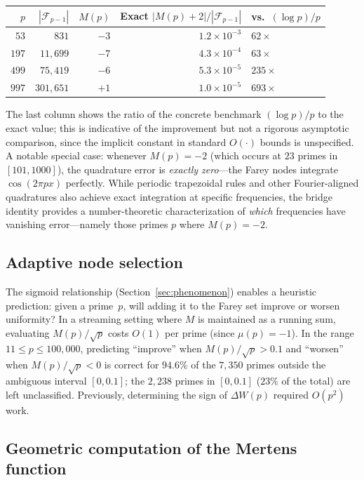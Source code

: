 \documentclass[11pt]{article}
\theoremstyle{definition}
\newcommand{\F}{\mathcal{F}}
\begin{document}
\begin{center}
\begin{tabular}{rrrrl}
\toprule
$p$ & $|\F_{p-1}|$ & $M(p)$ & Exact $|M(p)+2|/|\F_{p-1}|$ & vs.\ $(\log p)/p$ \\
\midrule
$53$ & $831$ & $-3$ & $1.2 \times 10^{-3}$ & $62\times$ \\
$197$ & $11{,}699$ & $-7$ & $4.3 \times 10^{-4}$ & $63\times$ \\
$499$ & $75{,}419$ & $-6$ & $5.3 \times 10^{-5}$ & $235\times$ \\
$997$ & $301{,}651$ & $+1$ & $1.0 \times 10^{-5}$ & $693\times$ \\
\bottomrule
\end{tabular}
\end{center}

\noindent The last column shows the ratio of the
concrete benchmark $(\log p)/p$ to the exact value;
this is indicative of the improvement but not a rigorous
asymptotic comparison, since the implicit constant in
standard $O(\cdot)$ bounds is unspecified.
A notable special case: whenever $M(p) = -2$
(which occurs at $23$ primes in $[101, 1000]$), the quadrature
error is \emph{exactly zero}---the Farey nodes integrate
$\cos(2\pi px)$ perfectly.  While periodic trapezoidal rules
and other Fourier-aligned quadratures also achieve exact integration
at specific frequencies, the bridge identity provides a number-theoretic
characterization of \emph{which} frequencies have vanishing error---namely
those primes $p$ where $M(p) = -2$.

\subsection{Adaptive node selection}

The sigmoid relationship (Section~\ref{sec:phenomenon}) enables
a heuristic prediction: given a prime~$p$, will adding it to the
Farey set improve or worsen uniformity?  In a streaming setting
where $M$ is maintained as a running sum, evaluating
$M(p)/\sqrt{p}$ costs $O(1)$ per prime (since $\mu(p) = -1$).
In the range $11 \le p \le 100{,}000$, predicting ``improve''
when $M(p)/\sqrt{p} > 0.1$ and ``worsen'' when
$M(p)/\sqrt{p} < 0$ is correct for $94.6\%$ of the $7{,}350$
primes outside the ambiguous interval $[0, 0.1]$; the $2{,}238$
primes in $[0, 0.1]$ ($23\%$ of the total) are left unclassified.
Previously, determining the sign of $\Delta W(p)$ required
$O(p^2)$ work.

\subsection{Geometric computation of the Mertens function}
\end{document}
